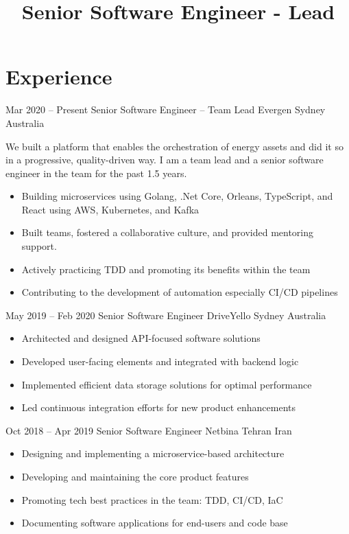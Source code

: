 \documentclass[12pt, a4paper, sans]{moderncv}
\title{Senior Software Engineer - Lead}
\begin{document}
    \makecvtitle


    \section{Experience}\label{sec:experience}

    \cventry
    {Mar 2020 -- Present}
    {Senior Software Engineer -- Team Lead}
    {\newline Evergen}
    {Sydney}
    {Australia}
    {
        We built a platform that enables the orchestration of energy assets and did it so in a progressive, quality-driven way.
        I am a team lead and a senior software engineer in the team for the past 1.5 years.
        \begin{itemize}
            \item Building microservices using Golang, .Net Core, Orleans, TypeScript, and React using AWS, Kubernetes, and Kafka
            \item Built teams, fostered a collaborative culture, and provided mentoring support.
            \item Actively practicing TDD and promoting its benefits within the team
            \item Contributing to the development of automation especially CI/CD pipelines
        \end{itemize}
    }

    \cventry
    {May 2019 -- Feb 2020}
    {Senior Software Engineer}
    {\newline DriveYello}
    {Sydney}
    {Australia}
    {
        \begin{itemize}
            \item Architected and designed API-focused software solutions
            \item Developed user-facing elements and integrated with backend logic
            \item Implemented efficient data storage solutions for optimal performance
            \item Led continuous integration efforts for new product enhancements
        \end{itemize}
    }

    \cventry
    {Oct 2018 -- Apr 2019}
    {Senior Software Engineer}
    {\newline Netbina}
    {Tehran}
    {Iran}
    {
        \begin{itemize}
            \item Designing and implementing a microservice-based architecture
            \item Developing and maintaining the core product features
            \item Promoting tech best practices in the team: TDD, CI/CD, IaC
            \item Documenting software applications for end-users and code base
        \end{itemize}
    }
\end{document}
